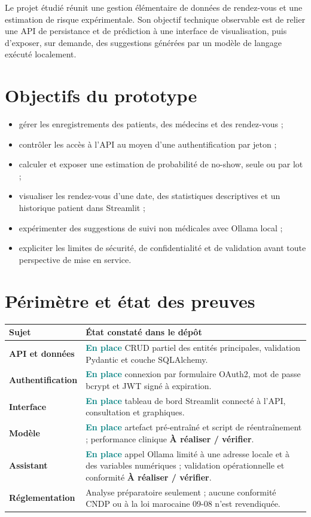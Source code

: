 \documentclass[11pt,a4paper]{report}
\newcommand{\implemented}{\textcolor{teal}{\textbf{En place}}}
\newcommand{\planned}{\textcolor{amber}{\textbf{À réaliser / vérifier}}}
\begin{document}
Le projet étudié réunit une gestion élémentaire de données de rendez-vous et
une estimation de risque expérimentale. Son objectif technique observable est
de relier une API de persistance et de prédiction à une interface de
visualisation, puis d'exposer, sur demande, des suggestions générées par un
modèle de langage exécuté localement.

\section{Objectifs du prototype}
\begin{itemize}
  \item gérer les enregistrements des patients, des médecins et des rendez-vous ;
  \item contrôler les accès à l'API au moyen d'une authentification par jeton ;
  \item calculer et exposer une estimation de probabilité de no-show, seule ou
        par lot ;
  \item visualiser les rendez-vous d'une date, des statistiques descriptives
        et un historique patient dans Streamlit ;
  \item expérimenter des suggestions de suivi non médicales avec Ollama local ;
  \item expliciter les limites de sécurité, de confidentialité et de validation
        avant toute perspective de mise en service.
\end{itemize}

\section{Périmètre et état des preuves}
\begin{tabularx}{\textwidth}{>{\bfseries}p{3.1cm}X}
\toprule
Sujet & État constaté dans le dépôt\\
\midrule
API et données & \implemented{} CRUD partiel des entités principales,
validation Pydantic et couche SQLAlchemy.\\
Authentification & \implemented{} connexion par formulaire OAuth2, mot de
passe bcrypt et JWT signé à expiration.\\
Interface & \implemented{} tableau de bord Streamlit connecté à l'API,
consultation et graphiques.\\
Modèle & \implemented{} artefact pré-entraîné et script de réentraînement ;
performance clinique \planned{}.\\
Assistant & \implemented{} appel Ollama limité à une adresse locale et à des
variables numériques ; validation opérationnelle et conformité \planned{}.\\
Réglementation & Analyse préparatoire seulement ; aucune conformité CNDP ou
à la loi marocaine 09-08 n'est revendiquée.\\
\bottomrule
\end{tabularx}
\end{document}
